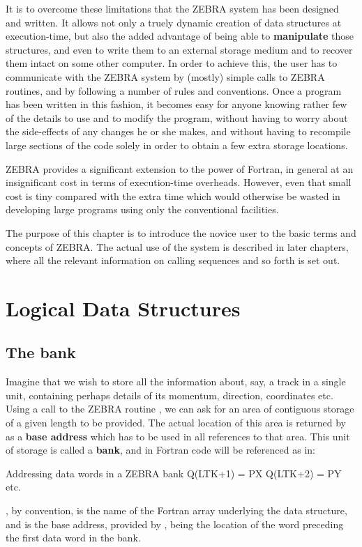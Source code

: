 It is to overcome these limitations that the ZEBRA system has been
designed and written. It allows not only a truely dynamic
creation of data structures at execution-time, but also the added
advantage of being able to
{\bf manipulate} those structures, and even to write them to an external
storage medium and to recover them intact on some other computer.
In order to achieve this, the
user has to communicate with the ZEBRA system by (mostly) simple calls
to ZEBRA routines, and by following a number of rules and conventions.
Once a program has been written in this fashion, it becomes easy
for anyone knowing rather few of the details to use and to modify the
program, without having to worry about the side-effects of any changes
he or she makes, and without having to recompile large sections of the
code solely in order to obtain a few extra storage locations.
 
ZEBRA provides a significant extension to the power of Fortran, in
general at an insignificant cost in terms of execution-time overheads.
However, even that small cost is tiny compared with the extra time which
would otherwise be wasted in developing large programs using only the
conventional facilities.
 
The purpose of this chapter is to introduce the novice user to the basic
terms and concepts of ZEBRA. The actual use of the system
is described in later
chapters, where all the relevant information on calling sequences and so
forth is set out.

\section{Logical Data Structures}
\subsection{The bank}

Imagine that we wish to store all the information about, say, a track in
a single unit, containing perhaps details of its momentum, direction,
coordinates etc. Using a call to the ZEBRA routine , we can ask
for an area of contiguous storage of a given length to be provided. The
actual location of this area is returned by  as a
{\bf base address} which has to be used in all references to that area.
This unit of storage is called a
{\bf bank}, and in Fortran code will be referenced as in:
\begin{XMPt}{Addressing data words in a ZEBRA bank}
      Q(LTK+1) = PX
      Q(LTK+2) = PY
      etc.
\end{XMPt}
, by convention, is the name of the Fortran array underlying the
data structure, and  is the base address,
provided by , being the location of the word
preceding the first data word in the bank.
 
